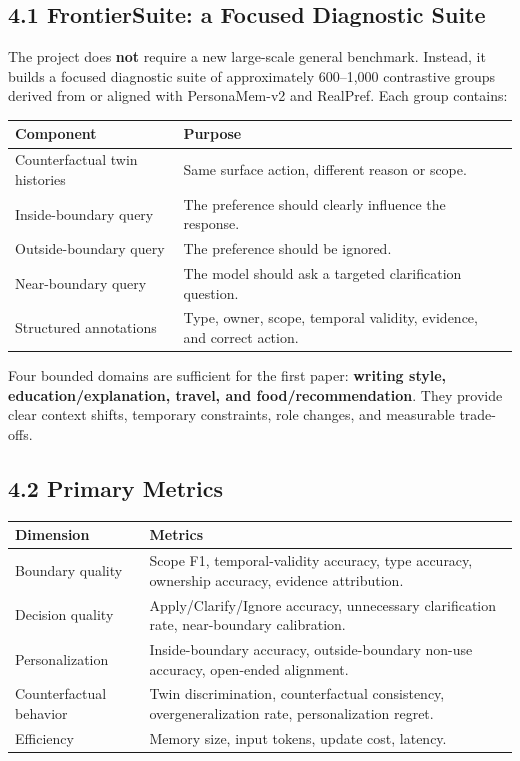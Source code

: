 \documentclass[10.5pt,a4paper]{article}
\begin{document}
\subsection{4.1 FrontierSuite: a Focused Diagnostic Suite}
The project does \textbf{not} require a new large-scale general benchmark. Instead, it builds a focused diagnostic suite of approximately 600--1,000 contrastive groups derived from or aligned with PersonaMem-v2 and RealPref. Each group contains:

\begin{center}
\begin{tabularx}{0.94\textwidth}{P{3.5cm}Y}
\toprule
{}
\textbf{Component} & \textbf{Purpose}\\
\midrule
Counterfactual twin histories & Same surface action, different reason or scope.\\
Inside-boundary query & The preference should clearly influence the response.\\
Outside-boundary query & The preference should be ignored.\\
Near-boundary query & The model should ask a targeted clarification question.\\
Structured annotations & Type, owner, scope, temporal validity, evidence, and correct action.\\
\bottomrule
\end{tabularx}
\end{center}

Four bounded domains are sufficient for the first paper: \textbf{writing style, education/explanation, travel, and food/recommendation}. They provide clear context shifts, temporary constraints, role changes, and measurable trade-offs.

\subsection{4.2 Primary Metrics}
\begin{tabularx}{\textwidth}{P{3.25cm}Y}
\toprule
{}
\textbf{Dimension} & \textbf{Metrics}\\
\midrule
Boundary quality & Scope F1, temporal-validity accuracy, type accuracy, ownership accuracy, evidence attribution.\\
Decision quality & Apply/Clarify/Ignore accuracy, unnecessary clarification rate, near-boundary calibration.\\
Personalization & Inside-boundary accuracy, outside-boundary non-use accuracy, open-ended alignment.\\
Counterfactual behavior & Twin discrimination, counterfactual consistency, overgeneralization rate, personalization regret.\\
Efficiency & Memory size, input tokens, update cost, latency.\\
\bottomrule
\end{tabularx}
\end{document}
